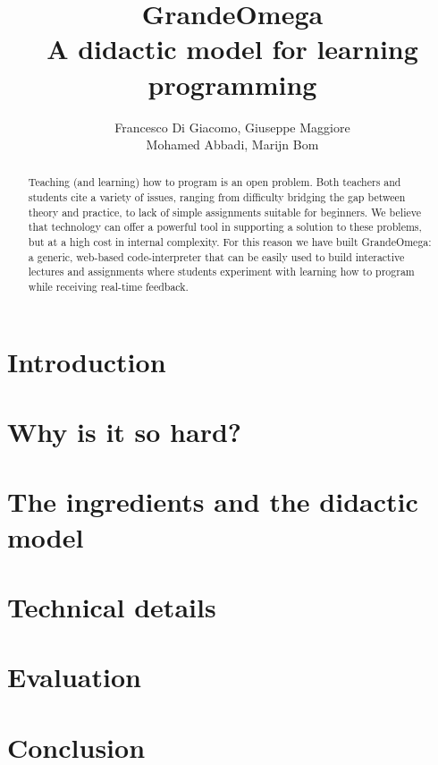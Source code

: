 \documentclass{article}
\title{GrandeOmega \\ A didactic model for learning programming}
\author{ Francesco Di Giacomo, Giuseppe Maggiore\\ Mohamed Abbadi, Marijn Bom }
\date { }
\begin{document}
\maketitle

\begin{abstract}
	Teaching (and learning) how to program is an open problem. Both teachers and students cite a variety of issues, ranging from difficulty bridging the gap between theory and practice, to lack of simple assignments suitable for beginners.
	We believe that technology can offer a powerful tool in supporting a solution to these problems, but at a high cost in internal complexity. For this reason we have built GrandeOmega: a generic, web-based code-interpreter that can be easily used to build interactive lectures and assignments where students experiment with learning how to program while receiving real-time feedback.
\end{abstract}

\section{Introduction}
\label{sec:introduction}


\section{Why is it so hard?}
\label{sec:problem}


\section{The ingredients and the didactic model}
\label{sec:solution}


\section{Technical details}
\label{sec:technical_details}


\section{Evaluation}
\label{sec:evaluation}


\section{Conclusion}
\label{sec:conclusion}

\end{document}
